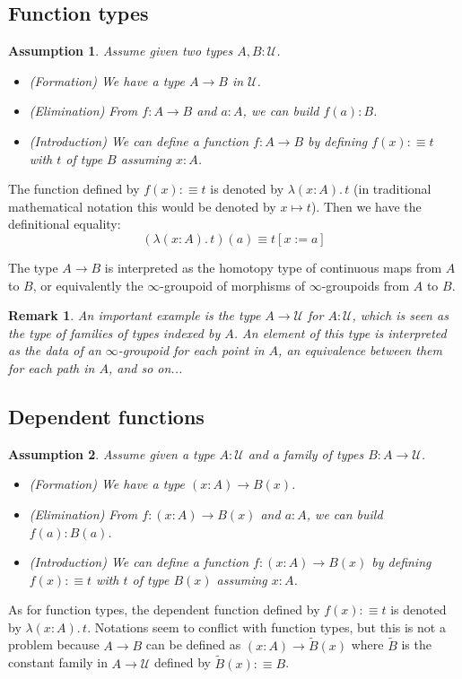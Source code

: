 \documentclass{article}
\newcommand{\sse}[1]{\medbreak \subsection{#1}}
\newcommand{\U}{{\mathcal U}}
\renewcommand{\r}{\rightarrow}
\newcommand{\Gl}{\lambda}
\newtheorem{remark}{Remark}
\newtheorem{assumption}{Assumption}
\begin{document}
\sse{Function types}

\begin{assumption}
Assume given two types $A,B:\U$.
\begin{itemize}
\item (Formation) We have a type $A\r B$ in $\U$.
\item (Elimination) From $f:A\r B$ and $a:A$, we can build $f(a):B$.
\item (Introduction) We can define a function $f:A\r B$ by defining $f(x):\equiv t$ with $t$ of type $B$ assuming $x:A$.
\end{itemize}
\end{assumption}

The function defined by $f(x):\equiv t$ is denoted by $\Gl (x:A).\, t$ (in traditional mathematical notation this would be denoted by $x\mapsto t$). Then we have the definitional equality:
\[(\Gl (x:A).\, t)(a) \equiv t[x:=a]\]

The type $A\r B$ is interpreted as the homotopy type of continuous maps from $A$ to $B$, or equivalently the $\infty$-groupoid of morphisms of $\infty$-groupoids from $A$ to $B$.

\begin{remark}
An important example is the type $A\r \U$ for $A:\U$, which is seen as the type of families of types indexed by $A$. An element of this type is interpreted as the data of an $\infty$-groupoid for each point in $A$, an equivalence between them for each path in $A$, and so on...
\end{remark}


\sse{Dependent functions}

\begin{assumption}
Assume given a type $A:\U$ and a family of types $B:A\r\U$.
\begin{itemize}
\item (Formation) We have a type $(x:A)\r B(x)$.
\item (Elimination) From $f:(x:A)\r B(x)$ and $a:A$, we can build $f(a):B(a)$.
\item (Introduction) We can define a function $f:(x:A)\r B(x)$ by defining $f(x):\equiv t$ with $t$ of type $B(x)$ assuming $x:A$.
\end{itemize}
\end{assumption}


As for function types, the dependent function defined by $f(x):\equiv t$ is denoted by $\Gl (x:A).\, t$. Notations seem to conflict with function types, but this is not a problem because $A\r B$ can be defined as $(x:A)\r \tilde{B}(x)$ where $\tilde{B}$ is the constant family in $A\r \U$ defined by $\tilde{B}(x) :\equiv B$. %
\end{document}
